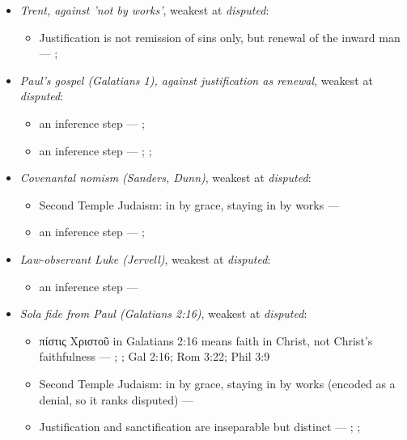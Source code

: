 \documentclass[11pt]{article}
\begin{document}
\begin{itemize}
\item \emph{Trent, against 'not by works'}, weakest at \emph{disputed}:
\begin{itemize}
\item Justification is not remission of sins only, but renewal of the inward man --- \cite[Trent, Session VI (1547), Decree on Justification, ch. 7]{tanner-decrees-1990}; \cite[Trent, Session VI (1547), canon 11]{tanner-decrees-1990}
\end{itemize}
\item \emph{Paul's gospel (Galatians 1), against justification as renewal}, weakest at \emph{disputed}:
\begin{itemize}
\item an inference step --- \cite[ad loc. Gal 1:6]{moo-galatians-2013}; \cite[XI.1]{westminster-confession-1647}
\item an inference step --- \cite[XI.1]{westminster-confession-1647}; \cite[III.xi.2]{calvin-institutes-1960}; \cite{morris-apostolic-preaching-1965}
\end{itemize}
\item \emph{Covenantal nomism (Sanders, Dunn)}, weakest at \emph{disputed}:
\begin{itemize}
\item Second Temple Judaism: in by grace, staying in by works --- \cite{sanders-paul-palestinian-judaism-1977}
\item an inference step --- \cite{dunn-new-perspective-2005}; \cite{wright-what-paul-said-1997}
\end{itemize}
\item \emph{Law-observant Luke (Jervell)}, weakest at \emph{disputed}:
\begin{itemize}
\item an inference step --- \cite{jervell-luke-people-god-1972}
\end{itemize}
\item \emph{Sola fide from Paul (Galatians 2:16)}, weakest at \emph{disputed}:
\begin{itemize}
\item πίστις Χριστοῦ in Galatians 2:16 means faith in Christ, not Christ's faithfulness --- \cite{dunn-once-more-pistis-christou-1991}; \cite{matlock-detheologizing-2000}; Gal 2:16; Rom 3:22; Phil 3:9
\item Second Temple Judaism: in by grace, staying in by works (encoded as a denial, so it ranks disputed) --- \cite{sanders-paul-palestinian-judaism-1977}
\item Justification and sanctification are inseparable but distinct --- \cite[XIII.1]{westminster-confession-1647}; \cite[XI.1]{westminster-confession-1647}; \cite[III.xi.6]{calvin-institutes-1960}

\end{itemize}
\end{itemize}
\end{document}
